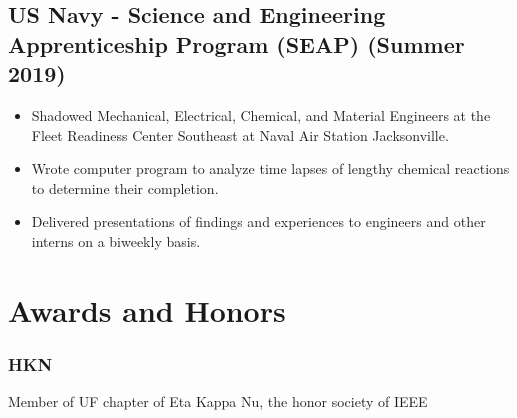 \documentclass{article}
\newcommand{\sectionspacing}{\vspace{-.4em}} %
\newenvironment{CustomItemize}
{ \begin{itemize}[leftmargin=1em]
    \setlength{\itemsep}{0pt}
    \setlength{\parskip}{0pt}
    \setlength{\parindent}{0pt}
    \setlength{\parsep}{0pt}     }
{ \end{itemize}                  }
\begin{document}
\subsection{US Navy - Science and Engineering Apprenticeship Program (SEAP) (Summer 2019)}
\begin{CustomItemize}
\item Shadowed Mechanical, Electrical, Chemical, and Material Engineers at the Fleet Readiness Center Southeast at Naval Air Station Jacksonville.
\item Wrote computer program to analyze time lapses of lengthy chemical reactions to determine their completion.
\item Delivered presentations of findings and experiences to engineers and other interns on a biweekly basis.
\end{CustomItemize}




\sectionspacing{}
\section{Awards and Honors}

\subsubsection{HKN}
Member of UF chapter of Eta Kappa Nu, the honor society of IEEE
\end{document}
